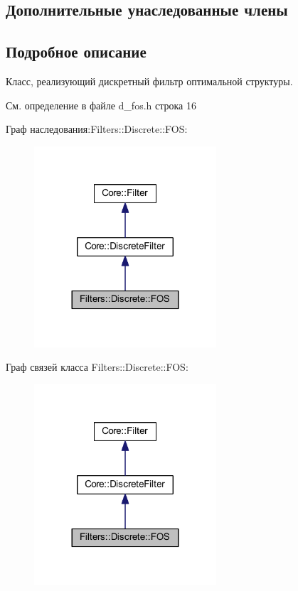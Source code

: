 \subsection*{Дополнительные унаследованные члены}


\subsection{Подробное описание}
Класс, реализующий дискретный фильтр оптимальной структуры. 

См. определение в файле d\+\_\+fos.\+h строка 16



Граф наследования\+:Filters\+:\+:Discrete\+:\+:F\+OS\+:\nopagebreak
\begin{figure}[H]
\begin{center}
\leavevmode
\includegraphics[width=192pt]{class_filters_1_1_discrete_1_1_f_o_s__inherit__graph}
\end{center}
\end{figure}


Граф связей класса Filters\+:\+:Discrete\+:\+:F\+OS\+:\nopagebreak
\begin{figure}[H]
\begin{center}
\leavevmode
\includegraphics[width=192pt]{class_filters_1_1_discrete_1_1_f_o_s__coll__graph}
\end{center}
\end{figure}


